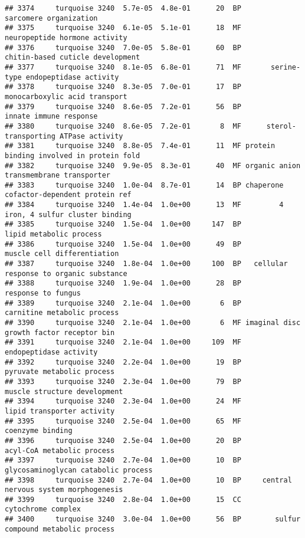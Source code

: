 \documentclass[]{article}
\begin{document}
\begin{verbatim}
## 3374     turquoise 3240  5.7e-05  4.8e-01      20  BP                   sarcomere organization
## 3375     turquoise 3240  6.1e-05  5.1e-01      18  MF            neuropeptide hormone activity
## 3376     turquoise 3240  7.0e-05  5.8e-01      60  BP         chitin-based cuticle development
## 3377     turquoise 3240  8.1e-05  6.8e-01      71  MF       serine-type endopeptidase activity
## 3378     turquoise 3240  8.3e-05  7.0e-01      17  BP            monocarboxylic acid transport
## 3379     turquoise 3240  8.6e-05  7.2e-01      56  BP                   innate immune response
## 3380     turquoise 3240  8.6e-05  7.2e-01       8  MF      sterol-transporting ATPase activity
## 3381     turquoise 3240  8.8e-05  7.4e-01      11  MF protein binding involved in protein fold
## 3382     turquoise 3240  9.9e-05  8.3e-01      40  MF organic anion transmembrane transporter 
## 3383     turquoise 3240  1.0e-04  8.7e-01      14  BP chaperone cofactor-dependent protein ref
## 3384     turquoise 3240  1.4e-04  1.0e+00      13  MF         4 iron, 4 sulfur cluster binding
## 3385     turquoise 3240  1.5e-04  1.0e+00     147  BP                  lipid metabolic process
## 3386     turquoise 3240  1.5e-04  1.0e+00      49  BP              muscle cell differentiation
## 3387     turquoise 3240  1.8e-04  1.0e+00     100  BP   cellular response to organic substance
## 3388     turquoise 3240  1.9e-04  1.0e+00      28  BP                       response to fungus
## 3389     turquoise 3240  2.1e-04  1.0e+00       6  BP              carnitine metabolic process
## 3390     turquoise 3240  2.1e-04  1.0e+00       6  MF imaginal disc growth factor receptor bin
## 3391     turquoise 3240  2.1e-04  1.0e+00     109  MF                   endopeptidase activity
## 3392     turquoise 3240  2.2e-04  1.0e+00      19  BP               pyruvate metabolic process
## 3393     turquoise 3240  2.3e-04  1.0e+00      79  BP             muscle structure development
## 3394     turquoise 3240  2.3e-04  1.0e+00      24  MF               lipid transporter activity
## 3395     turquoise 3240  2.5e-04  1.0e+00      65  MF                         coenzyme binding
## 3396     turquoise 3240  2.5e-04  1.0e+00      20  BP               acyl-CoA metabolic process
## 3397     turquoise 3240  2.7e-04  1.0e+00      10  BP      glycosaminoglycan catabolic process
## 3398     turquoise 3240  2.7e-04  1.0e+00      10  BP     central nervous system morphogenesis
## 3399     turquoise 3240  2.8e-04  1.0e+00      15  CC                       cytochrome complex
## 3400     turquoise 3240  3.0e-04  1.0e+00      56  BP        sulfur compound metabolic process

\end{verbatim}
\end{document}
